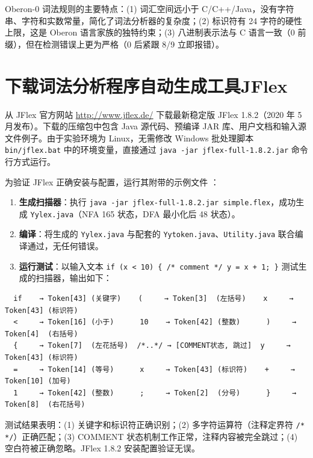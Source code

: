 Oberon-0 词法规则的主要特点：(1) 词汇空间远小于 C/C++/Java，没有字符串、字符和实数常量，简化了词法分析器的复杂度；(2) 标识符有 24 字符的硬性上限，这是 Oberon 语言家族的独特约束；(3) 八进制表示法与 C 语言一致（0 前缀），但在检测错误上更为严格（0 后紧跟 8/9 立即报错）。

\section{下载词法分析程序自动生成工具JFlex}

从 JFlex 官方网站 \url{http://www.jflex.de/} 下载最新稳定版 JFlex 1.8.2（2020 年 5 月发布）。下载的压缩包中包含 Java 源代码、预编译 JAR 库、用户文档和输入源文件例子。由于实验环境为 Linux，无需修改 Windows 批处理脚本 \texttt{bin/jflex.bat} 中的环境变量，直接通过 \texttt{java -jar jflex-full-1.8.2.jar} 命令行方式运行。

为验证 JFlex 正确安装与配置，运行其附带的示例文件 ：

\begin{enumerate}
    \item \textbf{生成扫描器}：执行 \texttt{java -jar jflex-full-1.8.2.jar simple.flex}，成功生成 \texttt{Yylex.java}（NFA 165 状态，DFA 最小化后 48 状态）。
    \item \textbf{编译}：将生成的 \texttt{Yylex.java} 与配套的 \texttt{Yytoken.java}、\texttt{Utility.java} 联合编译通过，无任何错误。
    \item \textbf{运行测试}：以输入文本 \texttt{if (x < 10) \{ /* comment */ y = x + 1; \}} 测试生成的扫描器，输出如下：
\end{enumerate}

{
\footnotesize
\begin{verbatim}
  if    → Token[43] (关键字)    (     → Token[3]  (左括号)    x     → Token[43] (标识符)
  <     → Token[16] (小于)      10    → Token[42] (整数)      )     → Token[4]  (右括号)
  {     → Token[7]  (左花括号)  /*..*/ → [COMMENT状态, 跳过]  y     → Token[43] (标识符)
  =     → Token[14] (等号)      x     → Token[43] (标识符)    +     → Token[10] (加号)
  1     → Token[42] (整数)      ;     → Token[2]  (分号)      }     → Token[8]  (右花括号)
\end{verbatim}
}

测试结果表明：(1) 关键字和标识符正确识别；(2) 多字符运算符（注释定界符 \texttt{/* */}）正确匹配；(3) COMMENT 状态机制工作正常，注释内容被完全跳过；(4) 空白符被正确忽略。JFlex 1.8.2 安装配置验证无误。


